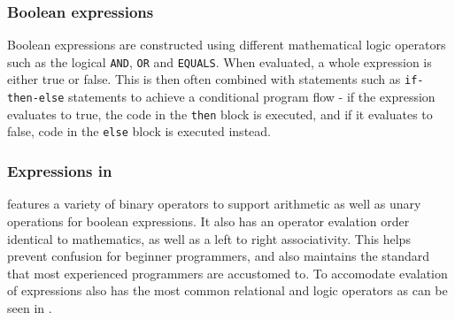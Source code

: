 \subsubsection*{Boolean expressions}
Boolean expressions are constructed using different mathematical logic operators such as the logical \texttt{AND}, \texttt{OR} and \texttt{EQUALS}. 
When evaluated, a whole expression is either true or false. 
This is then often combined with statements such as \texttt{if-then-else} statements to achieve a conditional program flow - if the expression evaluates to true, the code in the \texttt{then} block is executed, and if it evaluates to false, code in the \texttt{else} block is executed instead\cite{sebesta_concepts_2016}.

\subsubsection*{Expressions in \dazel{}}
\dazel{} features a variety of binary operators to support arithmetic as well as unary operations for boolean expressions.
It also has an operator evalation order identical to mathematics, as well as a left to right associativity. This helps prevent confusion for beginner programmers, 
and also maintains the standard that most experienced programmers are accustomed to.
To accomodate evalation of expressions \dazel{} also has the most common relational and logic operators as can be seen in . 

